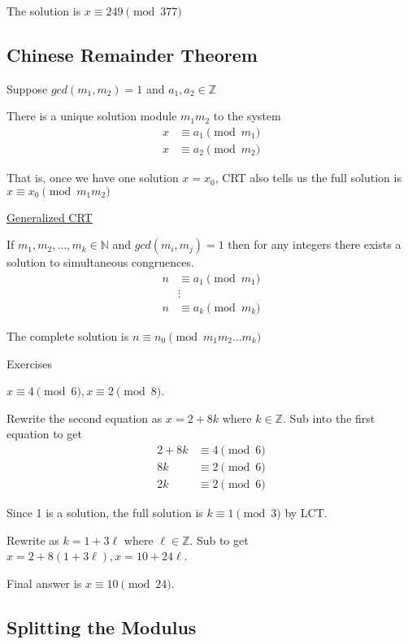 \documentclass{article}
\begin{document}
The solution is $x \equiv 249 \pmod{377}$

\subsection{Chinese Remainder Theorem}

Suppose $gcd(m_1, m_2) = 1$ and $a_1, a_2 \in \mathbb{Z}$

There is a unique solution module $m_1m_2$ to the system
\begin{align*}
    x &\equiv a_1 \pmod{m_1}\\
    x &\equiv a_2 \pmod{m_2}
\end{align*}

That is, once we have one solution $x = x_0$, CRT also tells us the full solution is $x \equiv x_0 \pmod{m_1m_2}$

\underline{Generalized CRT}

If $m_1, m_2, \ldots, m_k \in \mathbb{N}$ and $gcd(m_i, m_j)=1$ then for any integers there exists a solution to simultaneous congruences. 
\begin{align*}
    n &\equiv a_1 \pmod{m_1} \\
    &\vdots \\
    n &\equiv a_k \pmod{m_k}
\end{align*}

The complete solution is $n \equiv n_0 \pmod{m_1m_2\ldots m_k}$

Exercises

$x \equiv 4 \pmod{6}, x \equiv 2 \pmod{8}$. 

Rewrite the second equation as $x = 2 + 8k$ where $k \in \mathbb{Z}$. Sub into the first equation to get 
\begin{align*}
    2 + 8k &\equiv 4 \pmod{6}\\
    8k &\equiv 2 \pmod{6} \\
    2k &\equiv 2 \pmod{6}
\end{align*}

Since 1 is a solution, the full solution is $k \equiv 1 \pmod{3}$ by LCT. 

Rewrite as $k = 1 + 3\ell$ where $\ell \in \mathbb{Z}$. Sub to get $x = 2+ 8(1 + 3\ell), x = 10 + 24\ell$.

Final answer is $x \equiv 10 \pmod{24}$. 

\subsection{Splitting the Modulus}
\end{document}

